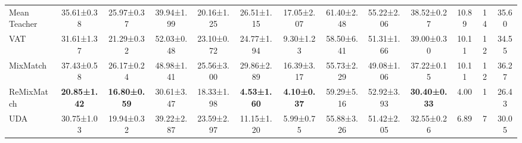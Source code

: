 \documentclass{article}
\begin{document}
\begin{table}[t!]
{\begin{tabular}{l|cc|cc|cc|cc|c|c|c|c}
Mean Teacher     & 35.61\tiny{±0.38}                        & 25.97\tiny{±0.37}                        & 39.94\tiny{±1.99}                    & 20.16\tiny{±1.25}                     & 26.51\tiny{±1.15}                      & 17.05\tiny{±2.07}                      & 61.40\tiny{±2.48}                          & 55.22\tiny{±2.06}                           & 38.52\tiny{±0.27}                           & 10.89                             & 14                             & 35.60                               \\
VAT              & 31.61\tiny{±1.37}                        & 21.29\tiny{±0.32}                        & 52.03\tiny{±0.48}                    & 23.10\tiny{±0.72}                     & 24.77\tiny{±1.94}                      & 9.30\tiny{±1.23}                       & 58.50\tiny{±6.41}                          & 51.31\tiny{±1.66}                           & 39.00\tiny{±0.30}                           & 10.11                             & 12                             & 34.55                               \\
MixMatch         & 37.43\tiny{±0.58}                        & 26.17\tiny{±0.24}                        & 48.98\tiny{±1.41}                    & 25.56\tiny{±3.00}                     & 29.86\tiny{±2.89}                      & 16.39\tiny{±3.17}                      & 55.73\tiny{±2.29}                          & 49.08\tiny{±1.06}                           & 37.22\tiny{±0.15}                           & 10.11                             & 12                             & 36.27                               \\
ReMixMatch       & \textbf{20.85\tiny{±1.42}}               & \textbf{16.80\tiny{±0.59}}               & 30.61\tiny{±3.47}                    & 18.33\tiny{±1.98}                     & \textbf{4.53\tiny{±1.60}}              & \textbf{4.10\tiny{±0.37}}              & 59.29\tiny{±5.16}                          & 52.92\tiny{±3.93}                           & \textbf{30.40\tiny{±0.33}}                  & 4.00                              & 1                              & 26.43                               \\
UDA              & 30.75\tiny{±1.03}                        & 19.94\tiny{±0.32}                        & 39.22\tiny{±2.87}                    & 23.59\tiny{±2.97}                     & 11.15\tiny{±1.20}                      & 5.99\tiny{±0.75}                       & 55.88\tiny{±3.26}                          & 51.42\tiny{±2.05}                           & 32.55\tiny{±0.26}                           & 6.89                              & 7                              & 30.05                               \\

\end{tabular}}
\end{table}
\end{document}
